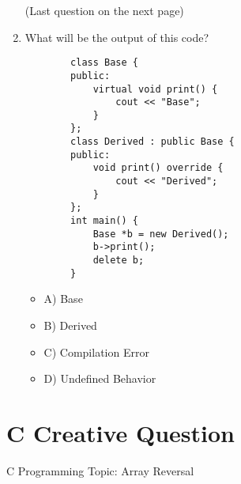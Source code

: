 \documentclass[a4paper,12pt]{article}
\begin{document}
\begin{enumerate}
    \begin{center}
        (Last question on the next page)
    \end{center}

    \newpage

    \item What will be the output of this code?

    \lstset{language=C++}
    \begin{lstlisting}
        class Base {
        public:
            virtual void print() {
                cout << "Base";
            }
        };
        class Derived : public Base {
        public:
            void print() override {
                cout << "Derived";
            }
        };
        int main() {
            Base *b = new Derived();
            b->print();
            delete b;
        }
    \end{lstlisting}

    \begin{itemize}
        \item A) Base
        \item B) Derived
        \item C) Compilation Error
        \item D) Undefined Behavior
    \end{itemize}
\end{enumerate}

\newpage

\section{C Creative Question}

C Programming Topic: Array Reversal
\end{document}
